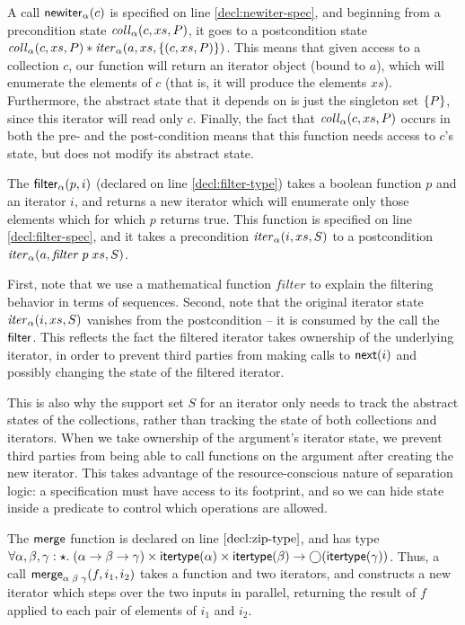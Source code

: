 A call $\mathsf{newiter}_\alpha(c)$ is specified on line
\ref{decl:newiter-spec}, and beginning from a precondition state
$\mathit{coll}_\alpha(c, xs, P)$, it goes to a postcondition state
$\mathit{coll}_\alpha(c, xs, P) * \mathit{iter}_\alpha(a, xs, \{{(c, xs, P)}\})$.
This means that given access to a collection $c$, our function will
return an iterator object (bound to $a$), which will enumerate the
elements of $c$ (that is, it will produce the elements
$xs$). Furthermore, the abstract state that it depends on is just the
singleton set $\{{P}\}$, since this iterator will read only $c$.
Finally, the fact that $\mathit{coll}_\alpha(c, xs, P)$ occurs in both
the pre- and the post-condition means that this function needs 
access to $c$'s state, but does not modify its abstract state. 

The $\mathsf{filter}_\alpha(p, i)$ (declared on line \ref{decl:filter-type})
takes a boolean function $p$ and an iterator $i$, and returns a new
iterator which will enumerate only those elements which for which $p$
returns true. This function is specified on line \ref{decl:filter-spec}, 
and it takes a precondition $\mathit{iter}_\alpha(i, xs, S)$ to a postcondition
$\mathit{iter}_\alpha(a, \mathit{filter}\;p\;xs, S)$. 

First, note that we use a mathematical function $\mathit{filter}$ to
explain the filtering behavior in terms of sequences. Second, note
that the original iterator state $\mathit{iter}_\alpha(i, xs, S)$ vanishes
from the postcondition -- it is consumed by the call the
$\mathsf{filter}$.  This reflects the fact the filtered iterator takes
ownership of the underlying iterator, in order to prevent third
parties from making calls to $\mathsf{next}(i)$ and possibly changing the
state of the filtered iterator.

This is also why the support set $S$ for an iterator only needs to
track the abstract states of the collections, rather than tracking the
state of both collections and iterators. When we take ownership of the
argument's iterator state, we prevent third parties from being able to
call functions on the argument after creating the new iterator. This
takes advantage of the resource-conscious nature of separation logic:
a specification must have access to its footprint, and so we can hide
state inside a predicate to control which operations are allowed.

The $\mathsf{merge}$ function is declared on line $\ref{decl:zip-type}$, and
has type $\forall \alpha,\beta,\gamma:\star.\; (\alpha \to \beta \to \gamma) \times \mathsf{itertype}(\alpha) \times
\mathsf{itertype}(\beta) \to \bigcirc{(\mathsf{itertype}(\gamma))}$.  Thus,
a call $\mathsf{merge}_{\alpha\;\beta\;\gamma}(f, i_1, i_2)$ takes a function and two 
iterators, and constructs a new iterator which steps over the two inputs in parallel,
returning the result of $f$ applied to each pair of elements of $i_1$ and $i_2$. 

